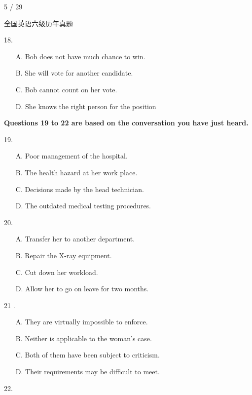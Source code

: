 \documentclass[UTF8,11pt]{ctexart}
\begin{document}
5 / 29


全国英语六级历年真题


18.


\begin{itemize}[leftmargin=2em,itemsep=.2em,topsep=.4em]\item[A.] Bob does not have much chance to win.
\item[B.] She will vote for another candidate.
\item[C.] Bob cannot count on her vote.
\item[D.] She knows the right person for the position
\end{itemize}

\textbf{Questions 19 to 22 are based on the conversation you have just heard.}


19.


\begin{itemize}[leftmargin=2em,itemsep=.2em,topsep=.4em]\item[A.] Poor management of the hospital.
\item[B.] The health hazard at her work place.
\item[C.] Decisions made by the head technician.
\item[D.] The outdated medical testing procedures.
\end{itemize}

20.


\begin{itemize}[leftmargin=2em,itemsep=.2em,topsep=.4em]\item[A.] Transfer her to another department.
\item[B.] Repair the X-ray equipment.
\item[C.] Cut down her workload.
\item[D.] Allow her to go on leave for two months.
\end{itemize}

21 .


\begin{itemize}[leftmargin=2em,itemsep=.2em,topsep=.4em]\item[A.] They are virtually impossible to enforce.
\item[B.] Neither is applicable to the woman's case.
\item[C.] Both of them have been subject to criticism.
\item[D.] Their requirements may be difficult to meet.
\end{itemize}

22.
\end{document}
